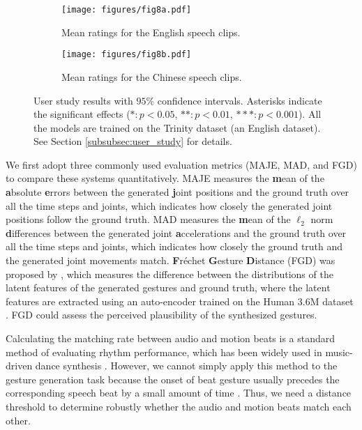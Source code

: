 \documentclass[acmtog,authorversion]{acmart}
\begin{document}
\begin{figure*}[t]
    \centering
    \begin{subfigure}[t]{0.48\textwidth}
        \centering
        \texttt{[image: figures/fig8a.pdf]}
        \caption{Mean ratings for the English speech clips.}
        \label{fig:fig8a}
    \end{subfigure}
    \hspace{\fill}
    \begin{subfigure}[t]{0.48\textwidth}
        \centering
        \texttt{[image: figures/fig8b.pdf]}
        \caption{Mean ratings for the Chinese speech clips.}
        \label{fig:fig8b}
    \end{subfigure}
    \caption{User study results with $95\%$ confidence intervals. Asterisks indicate the significant effects ($*: p < 0.05$, $**: p < 0.01$, $***: p < 0.001$). All the models are trained on the Trinity dataset (an English dataset). See Section \ref{subsubsec:user_study} for details.}
    \Description{}
    \label{fig:fig8}
\end{figure*}

We first adopt three commonly used evaluation metrics (MAJE, MAD, and FGD) to compare these systems quantitatively. 
MAJE measures the \textbf{m}ean of the \textbf{a}bsolute \textbf{e}rrors between the generated \textbf{j}oint positions and the ground truth over all the time steps and joints, which indicates how closely the generated joint positions follow the ground truth. 
MAD measures the \textbf{m}ean of the $\ell_2$ norm \textbf{d}ifferences between the generated joint \textbf{a}ccelerations and the ground truth over all the time steps and joints, which indicates how closely the ground truth and the generated joint movements match.
\textbf{F}r{\'e}chet \textbf{G}esture \textbf{D}istance (FGD) was proposed by \citet{yoon2020speech}, which measures the difference between the distributions of the latent features of the generated gestures and ground truth, where the latent features are extracted using an auto-encoder trained on the Human 3.6M dataset \cite{ionescu2013human3}. FGD could assess the perceived plausibility of the synthesized gestures.  

Calculating the matching rate between audio and motion beats is a standard method of evaluating rhythm performance, which has been widely used in music-driven dance synthesis \cite{Li_2021_aist, chen2021choreomaster}. However, we cannot simply apply this method to the gesture generation task because the onset of beat gesture usually precedes the corresponding speech beat by a small amount of time \cite{pouw2019quantifying}. Thus, we need a distance threshold to determine robustly whether the audio and motion beats match each other. 
\end{document}
